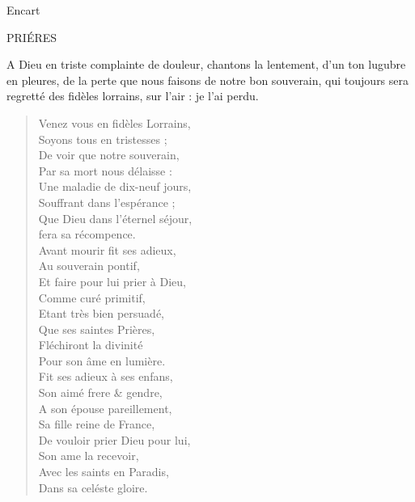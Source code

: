                      \begin{diary}{Encart}{}\begin{Large}PRIÉRES\end{Large}\bigskip

                         A Dieu en triste complainte de douleur, chantons la
                              lentement,
                              d’un ton lugubre en pleures, de la perte que nous faisons de
                              notre bon souverain, qui
                              toujours sera regretté des fidèles
                              lorrains, sur l'air : je l'ai perdu. \bigskip

        \begin{verse}Venez vous en fidèles Lorrains,\\Soyons tous en tristesses ;\\De voir que notre
                                 souverain,\\Par sa mort nous délaisse :\\Une maladie de dix-neuf jours,\\Souffrant dans l’espérance ;\\Que Dieu dans l'éternel séjour,\\fera sa récompence.\\Avant mourir fit ses adieux,\\Au souverain pontif,\\Et faire pour lui prier à Dieu,\\Comme curé primitif,\\Etant très bien persuadé,\\Que ses saintes Prières,\\Fléchiront la divinité\\Pour son âme en lumière.\\Fit ses
                                 adieux à ses enfans,\\Son aimé frere \&
                                 gendre,\\A son épouse
                                 pareillement,\\Sa fille reine de
                                    France,\\De vouloir prier Dieu pour lui,\\Son ame la recevoir,\\Avec les saints en Paradis,\\Dans sa celéste gloire.\\\end{verse}
        \bigskip


\end{diary}
